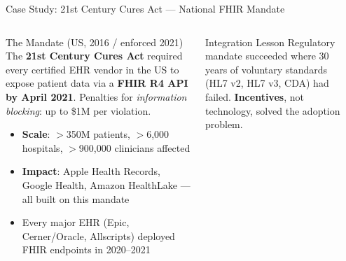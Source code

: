 \documentclass[aspectratio=169,10pt]{beamer}
\begin{document}
\begin{frame}{Case Study: 21st Century Cures Act — National FHIR Mandate}
  \begin{columns}[T]
      \begin{block}{The Mandate (US, 2016 / enforced 2021)}
        The \textbf{21st Century Cures Act} required every certified
        EHR vendor in the US to expose patient data via a
        \textbf{FHIR R4 API by April 2021}.
        Penalties for \emph{information blocking}: up to \$1M per violation.
        \begin{itemize}
          \item \textbf{Scale}: $>$350M patients, $>$6{,}000 hospitals,
                $>$900{,}000 clinicians affected
          \item \textbf{Impact}: Apple Health Records, Google Health,
                Amazon HealthLake — all built on this mandate
          \item Every major EHR (Epic, Cerner/Oracle, Allscripts)
                deployed FHIR endpoints in 2020--2021
        \end{itemize}
      \end{block}
      \vspace{4pt}
      \begin{alertblock}{Integration Lesson}
        Regulatory mandate succeeded where 30 years of voluntary
        standards (HL7 v2, HL7 v3, CDA) had failed.
        \textbf{Incentives}, not technology, solved the adoption problem.
      \end{alertblock}

      \begin{center}
\end{center}
\end{columns}
\end{frame}
\end{document}
